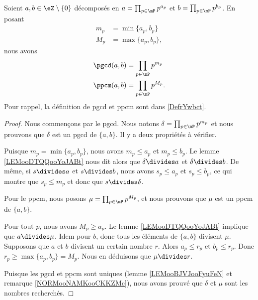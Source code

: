 \begin{proposition}     \label{PROPooNQBOooHWqTvs}
	Soient \( a,b\in \eZ\setminus\{ 0 \}\) décomposés en \( a=\prod_{p\in\mP}p^{a_p}\) et \( b=\prod_{p\in\mP}p^{b_p}\). En posant
	\begin{subequations}
		\begin{align}
			m_p & = \min\{ a_p,b_p \}  \\
			M_p & = \max\{ a_p,b_p \},
		\end{align}
	\end{subequations}
	nous avons
	\begin{subequations}
		\begin{align}
			\pgcd(a,b) & = \prod_{p\in\mP}p^{m_p}  \\
			\ppcm(a,b) & = \prod_{p\in\mP}p^{M_p}.
		\end{align}
	\end{subequations}
	Pour rappel, la définition de pgcd et ppcm sont dans \ref{DefrYwbct}.
\end{proposition}

\begin{proof}
	Nous commençons par le pgcd. Nous notons \( \delta=\prod_{p\in\mP}p^{m_p}\) et nous prouvons que \( \delta\) est un pgcd de \( \{ a,b \}\). Il y a deux propriétés à vérifier.

	\begin{subproof}
		Puisque \( m_p=\min\{ a_p,b_p \}\), nous avons \( m_p\leq a_p\) et \( m_p\leq b_p\). Le lemme \ref{LEMooDTQQooYoJABt} nous dit alors que \( \delta\divides a\) et \( \delta\divides b\).
		\spitem[Si \( s\) divise \( a\) et \( b\)]
		De même, si \(s\divides a\) et \( s\divides b\), nous avons \( s_p\leq a_p\) et \( s_p\leq b_p\), ce qui montre que \( s_p\leq m_p\) et donc que \( s\divides \delta\).
	\end{subproof}

	Pour le ppcm, nous posons \( \mu=\prod_{p\in\mP}p^{M_p}\), et nous prouvons que \( \mu\) est un ppcm de \( \{ a,b \}\).
	\begin{subproof}
		\spitem[\( a\) et \( b\) divisent \( \mu\)]
		Pour tout \( p\), nous avons \( M_p\geq a_p\). Le lemme \ref{LEMooDTQQooYoJABt} implique que \( a\divides \mu\). Idem pour \( b\), donc tous les éléments de \( \{ a,b \}\) divisent \( \mu\).
		\spitem[Si \( a\) et \( b\) divisent \( r\)]
		Supposons que \( a\) et \( b\) divisent un certain nombre \( r\). Alors \( a_p\leq r_p\) et \( b_p\leq r_p\). Donc \( r_p\geq\max\{ a_p,b_p \}=M_p\). Nous en déduisons que \( \mu\divides r\).
	\end{subproof}

	Puisque les pgcd et ppcm sont uniques (lemme \ref{LEMooBJVJooFyuFeN} et remarque \ref{NORMooNAMKooCKKZMc}), nous avons prouvé que \( \delta\) et \( \mu\) sont les nombres recherchés.
\end{proof}

